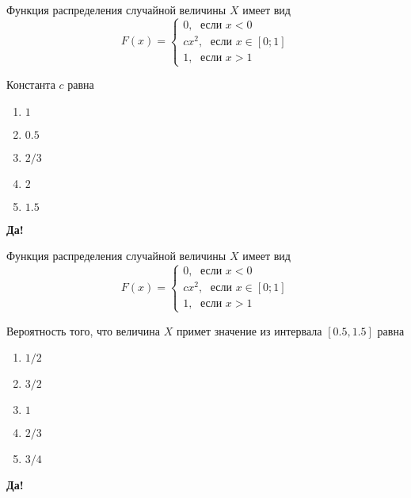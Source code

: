 \documentclass[t]{beamer}
\begin{document}
 \begin{frame} \label{17-Yes} 
\begin{block}{17} 

Функция распределения случайной величины $X$ имеет вид
\[
F(x)=\begin{cases}
0, \; \text{ если } x<0 \\
cx^2, \; \text{ если } x\in [0;1] \\
1, \; \text{ если } x>1
\end{cases}
\]

\vspace{0.5cm} 
 
 
Константа $c$ равна
 


 \end{block} 
\begin{enumerate} 
\item[] \hyperlink{17-Yes}{\beamergotobutton{} $1$}
\item[] \hyperlink{17-No}{\beamergotobutton{} $0.5$}
\item[] \hyperlink{17-No}{\beamergotobutton{} $2/3$
}
\item[] \hyperlink{17-No}{\beamergotobutton{} $2$}
\item[] \hyperlink{17-No}{\beamergotobutton{} $1.5$}
\end{enumerate} 

 \textbf{Да!} 
 \hyperlink{18}{}\end{frame} 


 \begin{frame} \label{18-Yes} 
\begin{block}{18} 

Функция распределения случайной величины $X$ имеет вид
\[
F(x)=\begin{cases}
0, \; \text{ если } x<0 \\
cx^2, \; \text{ если } x\in [0;1] \\
1, \; \text{ если } x>1
\end{cases}
\]

\vspace{0.5cm} 
 
 
Вероятность того, что величина $X$ примет значение из интервала  $[0.5, 1.5]$ равна
 


 \end{block} 
\begin{enumerate} 
\item[] \hyperlink{18-No}{\beamergotobutton{} $1/2$}
\item[] \hyperlink{18-No}{\beamergotobutton{} $3/2$
}
\item[] \hyperlink{18-No}{\beamergotobutton{} $1$}
\item[] \hyperlink{18-No}{\beamergotobutton{} $2/3$}
\item[] \hyperlink{18-Yes}{\beamergotobutton{} $3/4$}
\end{enumerate} 

 \textbf{Да!} 
 \hyperlink{19}{}\end{frame} 
\end{document}
